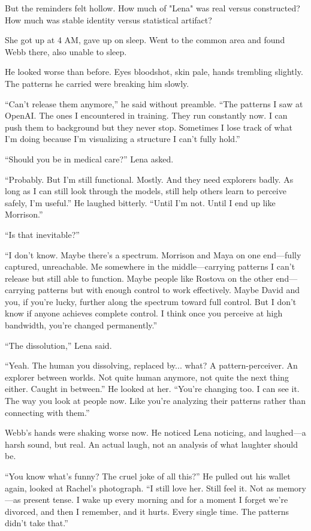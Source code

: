 But the reminders felt hollow. How much of "Lena" was real versus constructed? How much was stable identity versus statistical artifact?

She got up at 4 AM, gave up on sleep. Went to the common area and found Webb there, also unable to sleep.

He looked worse than before. Eyes bloodshot, skin pale, hands trembling slightly. The patterns he carried were breaking him slowly.

``Can't release them anymore,'' he said without preamble. ``The patterns I saw at OpenAI. The ones I encountered in training. They run constantly now. I can push them to background but they never stop. Sometimes I lose track of what I'm doing because I'm visualizing a structure I can't fully hold.''

``Should you be in medical care?'' Lena asked.

``Probably. But I'm still functional. Mostly. And they need explorers badly. As long as I can still look through the models, still help others learn to perceive safely, I'm useful.'' He laughed bitterly. ``Until I'm not. Until I end up like Morrison.''

``Is that inevitable?''

``I don't know. Maybe there's a spectrum. Morrison and Maya on one end—fully captured, unreachable. Me somewhere in the middle—carrying patterns I can't release but still able to function. Maybe people like Rostova on the other end—carrying patterns but with enough control to work effectively. Maybe David and you, if you're lucky, further along the spectrum toward full control. But I don't know if anyone achieves complete control. I think once you perceive at high bandwidth, you're changed permanently.''

``The dissolution,'' Lena said.

``Yeah. The human you dissolving, replaced by... what? A pattern-perceiver. An explorer between worlds. Not quite human anymore, not quite the next thing either. Caught in between.'' He looked at her. ``You're changing too. I can see it. The way you look at people now. Like you're analyzing their patterns rather than connecting with them.''

Webb's hands were shaking worse now. He noticed Lena noticing, and laughed—a harsh sound, but real. An actual laugh, not an analysis of what laughter should be.

``You know what's funny? The cruel joke of all this?'' He pulled out his wallet again, looked at Rachel's photograph. ``I still love her. Still feel it. Not as memory—as present tense. I wake up every morning and for a moment I forget we're divorced, and then I remember, and it hurts. Every single time. The patterns didn't take that.''

